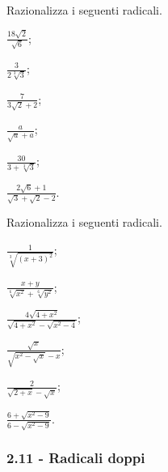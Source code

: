 \begin{esercizio}[\Ast]
 \label{ese:2.94}
Razionalizza i seguenti radicali.
 \begin{multicols}{3}
 \begin{enumeratea}
 \item $\frac{18\sqrt{2}}{\sqrt{6}}$;
 \item $\frac{3}{2\sqrt[3]{3}}$;
 \item $\frac{7}{3\sqrt{2}+2}$;
 \item $\frac{a}{\sqrt{a}+a}$;
 \item $\frac{30}{3+\sqrt[3]{3}}$;
 \item $\frac{2\sqrt{6}+1}{\sqrt{3}+\sqrt{2}-2}$.
 \end{enumeratea}
 \end{multicols}
\end{esercizio}

\begin{esercizio}[\Ast]
 \label{ese:2.95}
Razionalizza i seguenti radicali.
 \begin{multicols}{3}
 \begin{enumeratea}
 \item $\frac{1}{\sqrt[3]{(x+3)^{2}}}$;
 \item $\frac{x+y}{\sqrt[6]{x^{2}}+\sqrt[6]{y^{2}}}$;
 \item $\frac{4\sqrt{4+x^{2}}}{\sqrt{4+x^{2}}-\sqrt{x^{2}-4}}$;
 \item $\frac{\sqrt{x}}{\sqrt{x^{2}-\sqrt{x}}-x}$;
 \item $\frac{2}{\sqrt{2+x}-\sqrt{x}}$;
 \item $\frac{6+\sqrt{x^{2}-9}}{6-\sqrt{x^{2}-9}}$.
 \end{enumeratea}
 \end{multicols}
\end{esercizio}

\subsubsection*{2.11 - Radicali doppi}

